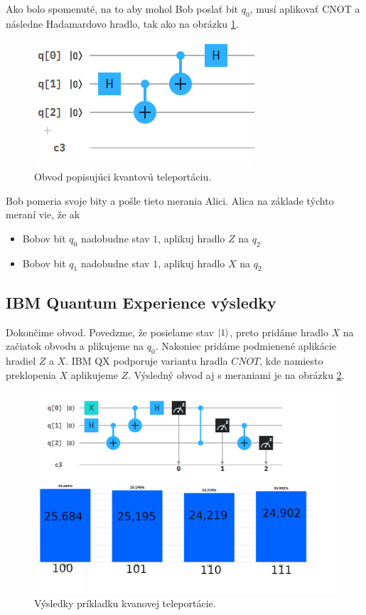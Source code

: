 Ako bolo spomenuté, na to aby mohol Bob poslať bit \(q_0\), musí aplikovať
CNOT a následne Hadamardovo hradlo, tak ako na obrázku \ref{tel_c2}.

\begin{figure}[H]
	\centering 
	\includegraphics[width=.5\textwidth]{figures/tel_c2.png} 
	\caption{Obvod popisujúci kvantovú teleportáciu.}
    \label{tel_c2}
\end{figure}

Bob pomeria svoje bity a pošle tieto merania Alici. Alica na základe týchto
meraní vie, že ak
\begin{itemize}
    \item[] Bobov bit \(q_0\) nadobudne stav \(1\), aplikuj hradlo \(Z\) na 
            \(q_2\)
    \item[] Bobov bit \(q_1\) nadobudne stav \(1\), aplikuj hradlo \(X\) na 
            \(q_2\)
\end{itemize}

\subsection*{IBM Quantum Experience výsledky}
Dokončime obvod. Povedzme, že posielame stav \(\ket{1}\), preto pridáme 
hradlo \(X\) na začiatok obvodu a plikujeme na \(q_0\). Nakoniec pridáme 
podmienené aplikácie hradiel \(Z\) a \(X\). IBM QX podporuje variantu hradla
\(CNOT\), kde namiesto preklopenia \(X\) aplikujeme \(Z\). Výsledný obvod aj
s meraniami je na obrázku \ref{tel_qx_results}.

\begin{figure}
	\centering 
	\includegraphics[width=.7\textwidth]{figures/tel_qx_results.png} 
	\caption{Výsledky príkladku kvanovej teleportácie.}
    \label{tel_qx_results}
\end{figure}

